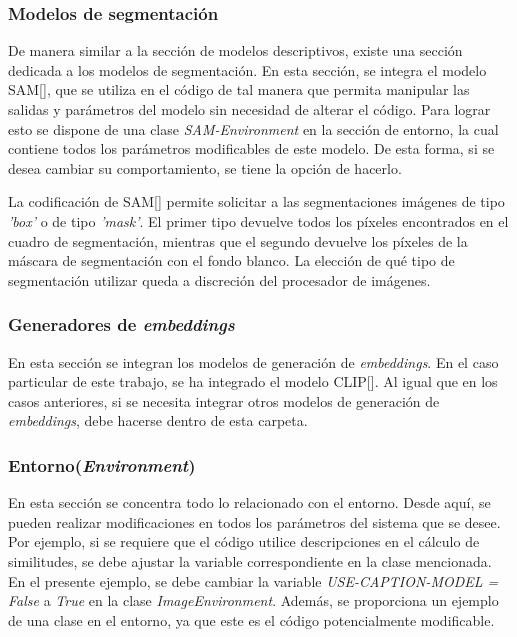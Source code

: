 \subsubsection{Modelos de segmentaci\'on}
De manera similar a la sección de modelos descriptivos, existe una sección dedicada a los modelos de segmentación. En esta sección, se integra el modelo SAM[\cite{huggingface2022sam}], que se utiliza en el código de tal manera que permita manipular las salidas y par\'ametros del modelo sin necesidad de alterar el código. Para lograr esto se dispone de una clase \textit{SAM-Environment} en la sección de entorno, la cual contiene todos los par\'ametros modificables de este modelo. De esta forma, si se desea cambiar su comportamiento, se tiene la opción de hacerlo.

La codificación de SAM[\cite{huggingface2022sam}] permite solicitar a las segmentaciones im\'agenes de tipo \textit{'box'} o de tipo \textit{'mask'}. El primer tipo devuelve todos los píxeles encontrados en el cuadro de segmentación, mientras que el segundo devuelve los píxeles de la m\'ascara de segmentación con el fondo blanco. La elección de qué tipo de segmentación utilizar queda a discreción del procesador de im\'agenes.

\subsubsection{Generadores de \textit{embeddings}}
En esta sección se integran los modelos de generación de \textit{embeddings}. En el caso particular de este trabajo, se ha integrado el modelo CLIP[\cite{git-clip}]. Al igual que en los casos anteriores, si se necesita integrar otros modelos de generación de \textit{embeddings}, debe hacerse dentro de esta carpeta.

\subsubsection{Entorno(\textit{Environment})}
En esta sección se concentra todo lo relacionado con el entorno. Desde aquí, se pueden realizar modificaciones en todos los par\'ametros del sistema que se desee. Por ejemplo, si se requiere que el código utilice descripciones en el c\'alculo de similitudes, se debe ajustar la variable correspondiente en la clase mencionada. En el presente ejemplo, se debe cambiar la variable \textit{USE-CAPTION-MODEL = False} a \textit{True} en la clase \textit{ImageEnvironment}. Adem\'as, se proporciona un ejemplo de una clase en el entorno, ya que este es el código potencialmente modificable.

